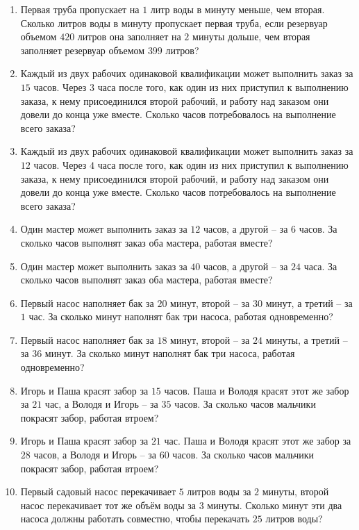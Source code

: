 \documentclass[12pt, a4paper]{article}
\begin{document}
\begin{enumerate}
		\item Первая труба пропускает на \(1\) литр воды в минуту меньше, чем вторая. Сколько литров воды в минуту пропускает первая труба, если резервуар объемом \(420\) литров она заполняет на \( 2 \) минуты дольше, чем вторая заполняет резервуар объемом \(399\) литров?
		\item Каждый из двух рабочих одинаковой квалификации может выполнить заказ за \( 15 \) часов. Через \( 3 \) часа после того, как один из них приступил к выполнению заказа, к нему присоединился второй рабочий, и работу над заказом они довели до конца уже вместе. Сколько часов потребовалось на выполнение всего заказа?
		\item Каждый из двух рабочих одинаковой квалификации может выполнить заказ за \( 12 \) часов. Через \( 4 \) часа после того, как один из них приступил к выполнению заказа, к нему присоединился второй рабочий, и работу над заказом они довели до конца уже вместе. Сколько часов потребовалось на выполнение всего заказа?
		\item Один мастер может выполнить заказ за \( 12 \) часов, а другой – за \( 6 \) часов. За сколько часов выполнят заказ оба мастера, работая вместе?
		\item Один мастер может выполнить заказ за \( 40 \) часов, а другой – за \( 24 \) часа. За сколько часов выполнят заказ оба мастера, работая вместе?
		\item Первый насос наполняет бак за \( 20 \) минут, второй – за \( 30 \) минут, а третий – за \( 1 \) час. За сколько минут наполнят бак три насоса, работая одновременно?
		\item Первый насос наполняет бак за \( 18 \) минут, второй – за \( 24 \) минуты, а третий – за \( 36 \) минут. За сколько минут наполнят бак три насоса, работая одновременно?
		\item Игорь и Паша красят забор за \( 15 \) часов. Паша и Володя красят этот же забор за \( 21 \) час, а Володя и Игорь – за \( 35 \) часов. За сколько часов мальчики покрасят забор, работая втроем?
		\item Игорь и Паша красят забор за \( 21 \) час. Паша и Володя красят этот же забор за \( 28 \) часов, а Володя и Игорь – за \( 60 \) часов. За сколько часов мальчики покрасят забор, работая втроем?
		\item Первый садовый насос перекачивает \( 5 \) литров воды за \( 2 \) минуты, второй насос перекачивает тот же объём воды за \( 3 \) минуты. Сколько минут эти два насоса должны работать совместно, чтобы перекачать \( 25 \) литров воды?

\end{enumerate}
\end{document}

